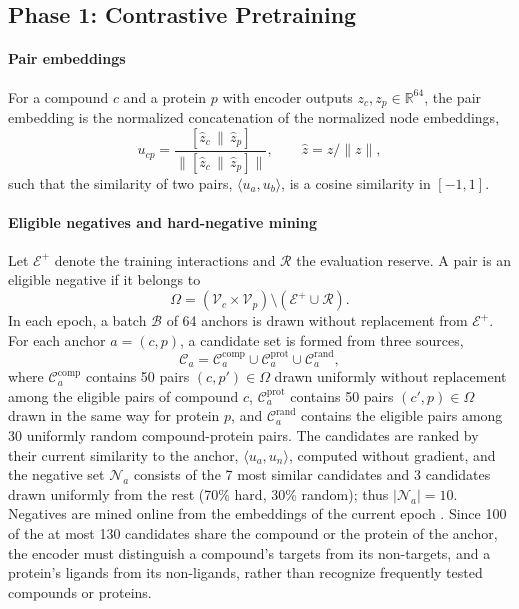\documentclass[11pt,letterpaper]{article}
\begin{document}
\subsection{Phase 1: Contrastive Pretraining}

\paragraph{Pair embeddings}
For a compound $c$ and a protein $p$ with encoder outputs $z_c,z_p\in\mathbb{R}^{64}$, the pair embedding is the normalized concatenation of the normalized node embeddings,
\[
u_{cp} = \frac{[\hat{z}_c \,\|\, \hat{z}_p]}{\big\|[\hat{z}_c \,\|\, \hat{z}_p]\big\|},
\qquad \hat{z} = z/\|z\|,
\]
such that the similarity of two pairs, $\langle u_a,u_b\rangle$, is a cosine similarity in $[-1,1]$.

\paragraph{Eligible negatives and hard-negative mining}
Let $\mathcal{E}^{+}$ denote the training interactions and $\mathcal{R}$ the evaluation reserve. A pair is an eligible negative if it belongs to
\[
\Omega = (\mathcal{V}_c\times\mathcal{V}_p)\setminus(\mathcal{E}^{+}\cup\mathcal{R}).
\]
In each epoch, a batch $\mathcal{B}$ of 64 anchors is drawn without replacement from $\mathcal{E}^{+}$. For each anchor $a=(c,p)$, a candidate set is formed from three sources,
\[
\mathcal{C}_a = \mathcal{C}_a^{\text{comp}}\cup\mathcal{C}_a^{\text{prot}}\cup\mathcal{C}_a^{\text{rand}},
\]
where $\mathcal{C}_a^{\text{comp}}$ contains 50 pairs $(c,p')\in\Omega$ drawn uniformly without replacement among the eligible pairs of compound $c$, $\mathcal{C}_a^{\text{prot}}$ contains 50 pairs $(c',p)\in\Omega$ drawn in the same way for protein $p$, and $\mathcal{C}_a^{\text{rand}}$ contains the eligible pairs among 30 uniformly random compound-protein pairs. The candidates are ranked by their current similarity to the anchor, $\langle u_a,u_n\rangle$, computed without gradient, and the negative set $\mathcal{N}_a$ consists of the 7 most similar candidates and 3 candidates drawn uniformly from the rest (70\% hard, 30\% random); thus $|\mathcal{N}_a|=10$. Negatives are mined online from the embeddings of the current epoch \cite{schroff2015facenet, hermans2017defense}. Since 100 of the at most 130 candidates share the compound or the protein of the anchor, the encoder must distinguish a compound's targets from its non-targets, and a protein's ligands from its non-ligands, rather than recognize frequently tested compounds or proteins.
\end{document}
